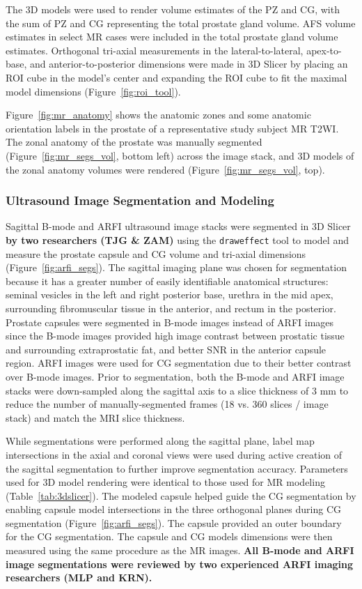 The 3D models were used to render volume estimates of the PZ and CG, with the
sum of PZ and CG representing the total prostate gland volume. AFS volume
estimates in select MR cases were included in the total prostate gland volume
estimates. Orthogonal tri-axial measurements in the lateral-to-lateral,
apex-to-base, and anterior-to-posterior dimensions were made in 3D Slicer by
placing an ROI cube in the model's center and expanding the ROI cube to fit the
maximal model dimensions (Figure~\ref{fig:roi_tool}). 



Figure~\ref{fig:mr_anatomy} shows the anatomic zones and some anatomic
orientation labels in the prostate of a representative study subject MR T2WI.
The zonal anatomy of the prostate was manually segmented
(Figure~\ref{fig:mr_segs_vol}, bottom left) across the image stack, and 3D
models of the zonal anatomy volumes were rendered
(Figure~\ref{fig:mr_segs_vol}, top).



\subsubsection{Ultrasound Image Segmentation and Modeling}
Sagittal B-mode and ARFI ultrasound image stacks were segmented in 3D Slicer
\textbf{by two researchers (TJG \& ZAM)} using the \verb+draweffect+ tool to
model and measure the prostate capsule and CG volume and tri-axial dimensions
(Figure~\ref{fig:arfi_segs}).   The sagittal
imaging plane was chosen for segmentation because it has a greater number of
easily identifiable anatomical structures:  seminal vesicles in the left and
right posterior base, urethra in the mid apex, surrounding fibromuscular tissue
in the anterior, and rectum in the posterior. Prostate capsules were segmented
in B-mode images instead of ARFI images since the B-mode images provided high
image contrast between prostatic tissue and surrounding extraprostatic fat, and
better SNR in the anterior capsule region. ARFI images were used for CG
segmentation due to their better contrast over B-mode images.  Prior to
segmentation, both the B-mode and ARFI image stacks were down-sampled along the
sagittal axis to a slice thickness of 3 mm to reduce the number of
manually-segmented frames (18 vs. 360 slices / image stack) and match the MRI
slice thickness. 

While segmentations were performed along the sagittal plane, label map
intersections in the axial and coronal views were used during active creation
of the sagittal segmentation to further improve segmentation accuracy.
Parameters used for 3D model rendering were identical to those used for MR
modeling (Table~\ref{tab:3dslicer}).  The modeled capsule helped guide the CG
segmentation by enabling capsule model intersections in the three orthogonal
planes during CG segmentation (Figure~\ref{fig:arfi_segs}). The capsule
provided an outer boundary for the CG segmentation. The capsule and CG models
dimensions were then measured using the same procedure as the MR images.
\textbf{All B-mode and ARFI image segmentations were reviewed by two experienced
    ARFI imaging researchers (MLP and KRN).}



